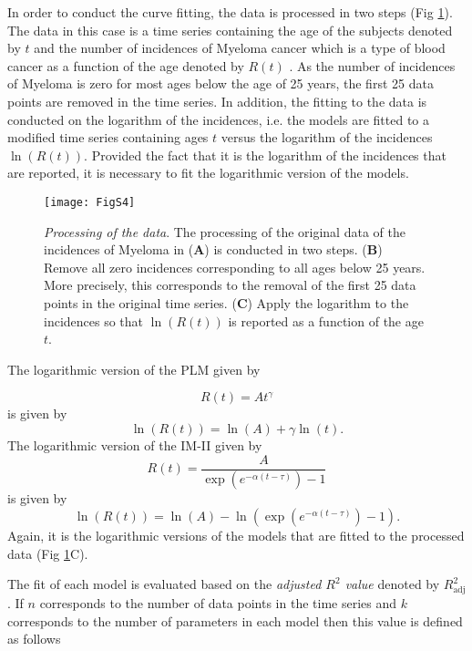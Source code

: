 In order to conduct the curve fitting, the data is processed in two steps (Fig \ref{fig:data_processing}). The data in this case is a time series containing the age of the subjects denoted by $t$ and the number of incidences of Myeloma cancer which is a type of blood cancer as a function of the age denoted by $R(t)$ \cite{Palmer1883,SEER}. As the number of incidences of Myeloma is zero for most ages below the age of 25 years, the first 25 data points are removed in the time series. In addition, the fitting to the data is conducted on the logarithm of the incidences, i.e. the models are fitted to a modified time series containing ages $t$ versus the logarithm of the incidences $\ln\left(R(t)\right)$. Provided the fact that it is the logarithm of the incidences that are reported, it is necessary to fit the logarithmic version of the models. 


\begin{figure}[htbp!]
  \texttt{[image: FigS4]}
  \caption[Processing of the data]{\textit{Processing of the data}. The processing of the original data of the incidences of Myeloma in (\textbf{A}) is conducted in two steps. (\textbf{B}) Remove all zero incidences corresponding to all ages below 25 years. More precisely, this corresponds to the removal of the first 25 data points in the original time series. (\textbf{C}) Apply the logarithm to the incidences so that $\ln\left(R(t)\right)$ is reported as a function of the age $t$.}
  \label{fig:data_processing}
  \end{figure}

  The logarithmic version of the PLM given by

  $$R(t)=At^{\gamma}$$
  is given by
  $$\ln\left(R(t)\right)=\ln(A)+\gamma\ln(t).$$
  The logarithmic version of the IM-II given by
  $$R(t)=\dfrac{A}{\exp\left(e^{-\alpha(t-\tau)}\right)-1}$$
  is given by
  $$\ln\left(R(t)\right)=\ln(A)-\ln\left(\exp\left(e^{-\alpha(t-\tau)}\right)-1\right).$$
  Again, it is the logarithmic versions of the models that are fitted to the processed data (Fig \ref{fig:data_processing}C).


  The fit of each model is evaluated based on the \textit{adjusted $R^2$ value} denoted by $R^2_{\mathrm{adj}}$. If $n$ corresponds to the number of data points in the time series and $k$ corresponds to the number of parameters in each model then this value is defined as follows

